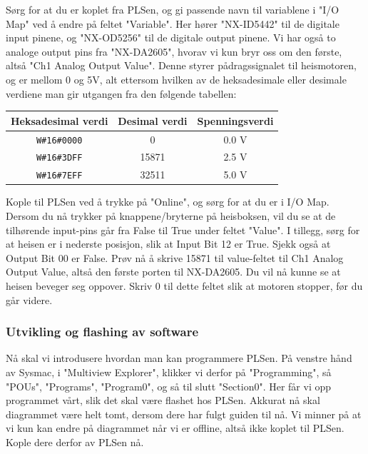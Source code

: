 \begin{alphasection}
Sørg for at du er koplet fra PLSen, og gi passende navn til variablene i "I/O Map" ved å endre på feltet "Variable". Her hører "NX-ID5442" til de digitale input pinene, og "NX-OD5256" til de digitale output pinene. Vi har også to analoge output pins fra "NX-DA2605", hvorav vi kun bryr oss om den første, altså "Ch1 Analog Output Value". Denne styrer pådragssignalet til heismotoren, og er mellom 0 og 5V, alt ettersom hvilken av de heksadesimale eller desimale verdiene man gir utgangen fra den følgende tabellen:

\begin{center}
 {\begin{tabular}{|c| c| c|} 
 \hline
 \textbf{Heksadesimal verdi} & \textbf{Desimal verdi} & \textbf{Spenningsverdi} \\ 
 \toprule
 \verb|W#16#0000| & 0 & 0.0 \si{\V} \\ 
 \hline
 \verb|W#16#3DFF| & 15871 & 2.5 \si{\V}  \\
 \hline
 \verb|W#16#7EFF| & 32511 & 5.0 \si{\V}  \\

 \toprule
\end{tabular}}
\end{center}

Kople til PLSen ved å trykke på "Online", og sørg for at du er i I/O Map. Dersom du nå trykker på knappene/bryterne på heisboksen, vil du se at de tilhørende input-pins går fra False til True under feltet "Value". I tillegg, sørg for at heisen er i nederste posisjon, slik at Input Bit 12 er True. Sjekk også at Output Bit 00 er False. Prøv nå å skrive 15871 til value-feltet til Ch1 Analog Output Value, altså den første porten til NX-DA2605. Du vil nå kunne se at heisen beveger seg oppover. Skriv 0 til dette feltet slik at motoren stopper, før du går videre.

\subsubsection{Utvikling og flashing av software}
Nå skal vi introdusere hvordan man kan programmere PLSen. På venstre hånd av Sysmac, i "Multiview Explorer", klikker vi derfor på "Programming", så "POUs", "Programs", "Program0", og så til slutt "Section0". Her får vi opp programmet vårt, slik det skal være flashet hos PLSen. Akkurat nå skal diagrammet være helt tomt, dersom dere har fulgt guiden til nå. Vi minner på at vi kun kan endre på diagrammet når vi er offline, altså ikke koplet til PLSen. Kople dere derfor av PLSen nå. \\


\end{alphasection}
